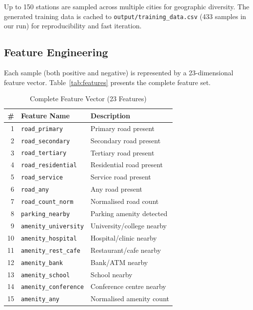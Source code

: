 \documentclass[conference]{IEEEtran}
\begin{document}
Up to 150 stations are sampled across multiple cities for geographic diversity. The generated training data is cached to \texttt{output/training\_data.csv} (433 samples in our run) for reproducibility and fast iteration.

\subsection{Feature Engineering}
\label{sec:features}

Each sample (both positive and negative) is represented by a 23-dimensional feature vector. Table~\ref{tab:features} presents the complete feature set.

\begin{table}[htbp]
\caption{Complete Feature Vector (23 Features)}
\begin{center}
\begin{tabular}{|r|l|l|}
\hline
\textbf{\#} & \textbf{Feature Name} & \textbf{Description} \\
\hline
1 & \texttt{road\_primary} & Primary road present \\
\hline
2 & \texttt{road\_secondary} & Secondary road present \\
\hline
3 & \texttt{road\_tertiary} & Tertiary road present \\
\hline
4 & \texttt{road\_residential} & Residential road present \\
\hline
5 & \texttt{road\_service} & Service road present \\
\hline
6 & \texttt{road\_any} & Any road present \\
\hline
7 & \texttt{road\_count\_norm} & Normalised road count \\
\hline
8 & \texttt{parking\_nearby} & Parking amenity detected \\
\hline
9 & \texttt{amenity\_university} & University/college nearby \\
\hline
10 & \texttt{amenity\_hospital} & Hospital/clinic nearby \\
\hline
11 & \texttt{amenity\_rest\_cafe} & Restaurant/cafe nearby \\
\hline
12 & \texttt{amenity\_bank} & Bank/ATM nearby \\
\hline
13 & \texttt{amenity\_school} & School nearby \\
\hline
14 & \texttt{amenity\_conference} & Conference centre nearby \\
\hline
15 & \texttt{amenity\_any} & Normalised amenity count \\
\hline

\end{tabular}
\end{center}
\end{table}
\end{document}
